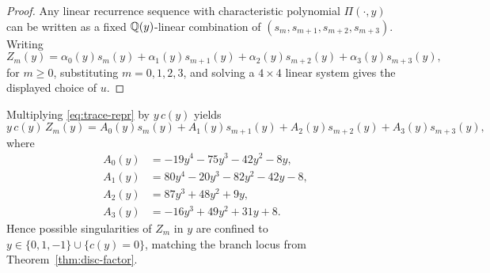 \begin{proof}
Any linear recurrence sequence with characteristic polynomial \(\Pi(\cdot,y)\) can be written as a fixed \(\mathbb{Q}(y)\)-linear combination of \((s_m,s_{m+1},s_{m+2},s_{m+3})\).
Writing
\[
Z_m(y)=\alpha_0(y)s_m(y)+\alpha_1(y)s_{m+1}(y)+\alpha_2(y)s_{m+2}(y)+\alpha_3(y)s_{m+3}(y),
\]
for \(m\ge 0\), substituting \(m=0,1,2,3\), and solving a \(4\times4\) linear system gives the displayed choice of \(u\).
\end{proof}

\begin{corollary}\label{cor:denominator-compression}
Multiplying \eqref{eq:trace-repr} by \(y\,c(y)\) yields
\begin{equation}\label{eq:denom-compress}
y\,c(y)\,Z_m(y)=
A_0(y)s_m(y)+A_1(y)s_{m+1}(y)+A_2(y)s_{m+2}(y)+A_3(y)s_{m+3}(y),
\end{equation}
where
\[
\begin{aligned}
A_0(y)&=-19y^4-75y^3-42y^2-8y,\\
A_1(y)&=80y^4-20y^3-82y^2-42y-8,\\
A_2(y)&=87y^3+48y^2+9y,\\
A_3(y)&=-16y^3+49y^2+31y+8.
\end{aligned}
\]
Hence possible singularities of \(Z_m\) in \(y\) are confined to \(y\in\{0,1,-1\}\cup\{c(y)=0\}\), matching the branch locus from Theorem~\ref{thm:disc-factor}.
\end{corollary}

